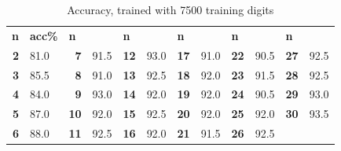 \documentclass[a4paper]{article}
\begin{document}
\begin{table}[ht]
\begin{tabular}{rlrlrlrlrlrl}
\multicolumn{1}{l}{\textbf{n}} & \textbf{acc\%} & \multicolumn{1}{l}{\textbf{n}} & \textbf{} & \multicolumn{1}{l}{\textbf{n}} & \textbf{} & \multicolumn{1}{l}{\textbf{n}} & \textbf{} & \multicolumn{1}{l}{\textbf{n}} & \textbf{} & \multicolumn{1}{l}{\textbf{n}} & \textbf{} \\
\textbf{2}                     & 81.0           & \textbf{7}                     & 91.5      & \textbf{12}                    & 93.0      & \textbf{17}                    & 91.0      & \textbf{22}                    & 90.5      & \textbf{27}                    & 92.5      \\
\textbf{3}                     & 85.5           & \textbf{8}                     & 91.0      & \textbf{13}                    & 92.5      & \textbf{18}                    & 92.0      & \textbf{23}                    & 91.5      & \textbf{28}                    & 92.5      \\
\textbf{4}                     & 84.0           & \textbf{9}                     & 93.0      & \textbf{14}                    & 92.0      & \textbf{19}                    & 92.0      & \textbf{24}                    & 90.5      & \textbf{29}                    & 93.0      \\
\textbf{5}                     & 87.0           & \textbf{10}                     & 92.0      & \textbf{15}                    & 92.5      & \textbf{20}                    & 92.0      & \textbf{25}                    & 92.0      & \textbf{30}                    & 93.5      \\
\textbf{6}                     & 88.0           & \textbf{11}                    & 92.5      & \textbf{16}                    & 92.0      & \textbf{21}                    & 91.5      & \textbf{26}                    & 92.5      & \multicolumn{1}{l}{}           &          
\end{tabular}
\caption{Accuracy, trained with 7500 training digits}
\end{table}
\end{document}
